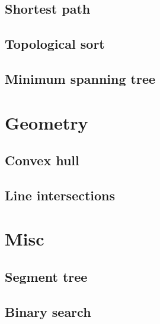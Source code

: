\documentclass[a4paper,10pt]{article}
\begin{document}
\subsection{Shortest path}
\subsection{Topological sort}
\subsection{Minimum spanning tree}
\section{Geometry}
\subsection{Convex hull}
\subsection{Line intersections}
\section{Misc}
\subsection{Segment tree}
\subsection{Binary search}
\end{document}
